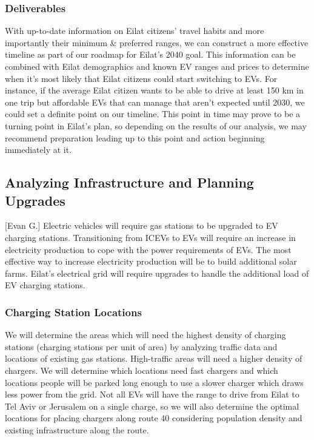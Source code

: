 \documentclass[12pt]{article}                         %
\begin{document}
\subsubsection{Deliverables}
With up-to-date information on Eilat citizens' travel habits and more importantly their minimum \& preferred ranges, we can construct a more effective timeline as part of our roadmap for Eilat's 2040 goal. This information can be combined with Eilat demographics and known EV ranges and prices to determine when it's most likely that Eilat citizens could start switching to EVs. For instance, if the average Eilat citizen wants to be able to drive at least 150 km in one trip but affordable EVs that can manage that aren't expected until 2030, we could set a definite point on our timeline. This point in time may prove to be a turning point in Eilat's plan, so depending on the results of our analysis, we may recommend preparation leading up to this point and action beginning immediately at it.

\subsection{Analyzing Infrastructure and Planning Upgrades}[Evan G.]
Electric vehicles will require gas stations to be upgraded to EV charging stations. Transitioning from ICEVs to EVs will require an increase in electricity production to cope with the power requirements of EVs. The most effective way to increase electricity production will be to build additional solar farms. Eilat's electrical grid will require upgrades to handle the additional load of EV charging stations. 

\subsubsection{Charging Station Locations}
We will determine the areas which will need the highest density of charging stations (charging stations per unit of area) by analyzing traffic data and locations of existing gas stations. High-traffic areas will need a higher density of chargers. We will determine which locations need fast chargers and which locations people will be parked long enough to use a slower charger which draws less power from the grid. Not all EVs will have the range to drive from Eilat to Tel Aviv or Jerusalem on a single charge, so we will also determine the optimal locations for placing chargers along route 40 considering population density and existing infrastructure along the route.
\end{document}
